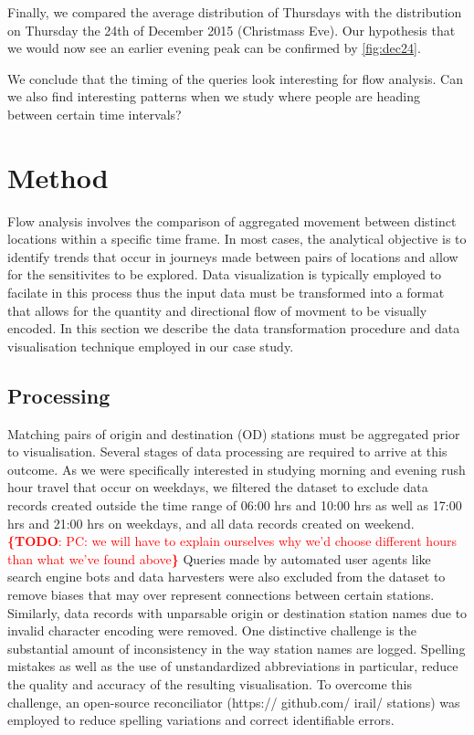 \documentclass{sig-alternate}
\newcommand{\todo}[1]{\noindent\textcolor{red}{{\bf \{TODO}: #1{\bf \}}}}
\begin{document}
Finally, we compared the average distribution of Thursdays with the distribution on Thursday the 24th of December 2015 (Christmass Eve).
Our hypothesis that we would now see an earlier evening peak can be confirmed by \cref{fig:dec24}.

We conclude that the timing of the queries look interesting for flow analysis. 
Can we also find interesting patterns when we study where people are heading between certain time intervals?

\section{Method}
\label{sec:method}

Flow analysis involves the comparison of aggregated movement between distinct locations within a specific time frame. 
In most cases, the analytical objective is to identify trends that occur in journeys made between pairs of locations and allow for the sensitivites to be explored. 
Data visualization is typically employed to facilate in this process thus the input data must be transformed into a format that allows for the quantity and directional flow of movment to be visually encoded. In this section we describe the data transformation procedure and data visualisation technique employed in our case study.

\subsection{Processing}

Matching pairs of origin and destination (OD) stations must be aggregated prior to visualisation.
Several stages of data processing are required to arrive at this outcome.
As we were specifically interested in studying morning and evening rush hour travel that occur on weekdays, we filtered the dataset to exclude data records created outside the time range of 06:00 hrs and 10:00 hrs as well as 17:00 hrs and 21:00 hrs on weekdays, and all data records created on weekend.
\todo{PC: we will have to explain ourselves why we'd choose different hours than what we've found above} 
Queries made by automated user agents like search engine bots and data harvesters were also excluded from the dataset to remove biases that may over represent connections between certain stations. 
Similarly, data records with unparsable origin or destination station names due to invalid character encoding were removed. 
One distinctive challenge is the substantial amount of inconsistency in the way station names are logged. 
Spelling mistakes as well as the use of unstandardized abbreviations in particular, reduce the quality and accuracy of the resulting visualisation.
To overcome this challenge, an open-source reconciliator (https:// github.com/ irail/ stations) was employed to reduce spelling variations and correct identifiable errors. 
\end{document}
